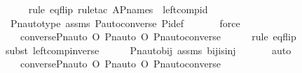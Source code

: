 \begin{isabellebody}
\ \ \ \ \isamarkupfalse%
{\isacharparenleft}{\kern0pt}rule\ eq{\isacharunderscore}{\kern0pt}flip{\isacharcomma}{\kern0pt}\ rule{\isacharunderscore}{\kern0pt}tac\ A{\isacharequal}{\kern0pt}P{\isacharunderscore}{\kern0pt}names\ \ left{\isacharunderscore}{\kern0pt}comp{\isacharunderscore}{\kern0pt}id{\isacharparenright}{\kern0pt}\isanewline
\ \ \ \ \isamarkupfalse%
\ Pn{\isacharunderscore}{\kern0pt}auto{\isacharunderscore}{\kern0pt}type\ assms\ P{\isacharunderscore}{\kern0pt}auto{\isacharunderscore}{\kern0pt}converse\ Pi{\isacharunderscore}{\kern0pt}def\ \isanewline
\ \ \ \ \isamarkupfalse%
\ force\isanewline
\ \ \isamarkupfalse%
\ \isamarkupfalse%
\ {\isachardoublequoteopen}{\isachardot}{\kern0pt}{\isachardot}{\kern0pt}{\isachardot}{\kern0pt}\ {\isacharequal}{\kern0pt}\ {\isacharparenleft}{\kern0pt}converse{\isacharparenleft}{\kern0pt}Pn{\isacharunderscore}{\kern0pt}auto{\isacharparenleft}{\kern0pt}{\isasympi}{\isacharparenright}{\kern0pt}{\isacharparenright}{\kern0pt}\ O\ Pn{\isacharunderscore}{\kern0pt}auto{\isacharparenleft}{\kern0pt}{\isasympi}{\isacharparenright}{\kern0pt}{\isacharparenright}{\kern0pt}\ O\ Pn{\isacharunderscore}{\kern0pt}auto{\isacharparenleft}{\kern0pt}converse{\isacharparenleft}{\kern0pt}{\isasympi}{\isacharparenright}{\kern0pt}{\isacharparenright}{\kern0pt}{\isachardoublequoteclose}\ \isanewline
\ \ \ \ \isamarkupfalse%
{\isacharparenleft}{\kern0pt}rule\ eq{\isacharunderscore}{\kern0pt}flip{\isacharparenright}{\kern0pt}\isanewline
\ \ \ \ \isamarkupfalse%
{\isacharparenleft}{\kern0pt}subst\ left{\isacharunderscore}{\kern0pt}comp{\isacharunderscore}{\kern0pt}inverse{\isacharparenright}{\kern0pt}\isanewline
\ \ \ \ \isamarkupfalse%
\ Pn{\isacharunderscore}{\kern0pt}auto{\isacharunderscore}{\kern0pt}bij\ assms\ bij{\isacharunderscore}{\kern0pt}is{\isacharunderscore}{\kern0pt}inj\ \isanewline
\ \ \ \ \isamarkupfalse%
\ auto\isanewline
\ \ \isamarkupfalse%
\ \isamarkupfalse%
\ {\isachardoublequoteopen}{\isachardot}{\kern0pt}{\isachardot}{\kern0pt}{\isachardot}{\kern0pt}\ {\isacharequal}{\kern0pt}\ converse{\isacharparenleft}{\kern0pt}Pn{\isacharunderscore}{\kern0pt}auto{\isacharparenleft}{\kern0pt}{\isasympi}{\isacharparenright}{\kern0pt}{\isacharparenright}{\kern0pt}\ O\ {\isacharparenleft}{\kern0pt}Pn{\isacharunderscore}{\kern0pt}auto{\isacharparenleft}{\kern0pt}{\isasympi}{\isacharparenright}{\kern0pt}\ O\ Pn{\isacharunderscore}{\kern0pt}auto{\isacharparenleft}{\kern0pt}converse{\isacharparenleft}{\kern0pt}{\isasympi}{\isacharparenright}{\kern0pt}{\isacharparenright}{\kern0pt}{\isacharparenright}{\kern0pt}{\isachardoublequoteclose}\ \isanewline

\end{isabellebody}
